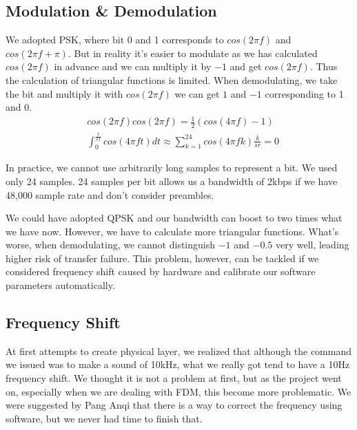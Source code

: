 \documentclass[conference,compsoc]{IEEEtran}
\begin{document}
		\subsection{Modulation \& Demodulation}
			We adopted PSK, where bit 0 and 1 corresponds to $cos(2\pi f)$ and $cos(2\pi f + \pi)$. 
			But in reality it's easier to modulate as we has calculated $cos(2\pi f)$ in advance and we can multiply it by $-1$ and get $cos(2\pi f)$.
			Thus the calculation of triangular functions is limited.
			When demodulating, we take the bit and multiply it with $cos(2\pi f)$ we can get $1$ and $-1$ corresponding to 1 and 0.
			\begin{equation*}\begin{aligned}
				& cos(2\pi f)cos(2\pi f) = \frac{1}{2}(cos(4\pi f) - 1) \\
				& \int_0^\frac{1}{2f} cos(4\pi ft)dt \approx \sum_{k=1}^{24}cos(4\pi fk)\frac{k}{sr} = 0
			\end{aligned}\end{equation*}
			\par
			In practice, we cannot use arbitrarily long samples to represent a bit. We used only 24 samples. 
			24 samples per bit allows us a bandwidth of 2kbps if we have 48,000 sample rate and don't consider preambles.
			\par
			We could have adopted QPSK and our bandwidth can boost to two times what we have now. 
			However, we have to calculate more triangular functions. 
			What's worse, when demodulating, we cannot distinguish $-1$ and $-0.5$ very well, leading higher risk of transfer failure.
			This problem, however, can be tackled if we considered frequency shift caused by hardware and calibrate our software parameters automatically.

	\subsection{Frequency Shift}
		At first attempts to create physical layer, we realized that although the command we issued was to make a sound of 10kHz, what we really got tend to have a 10Hz frequency shift.
		We thought it is not a problem at first, but as the project went on, especially when we are dealing with FDM, this become more problematic.
		We were suggested by Pang Anqi that there is a way to correct the frequency using software, but we never had time to finish that.

\end{document}
